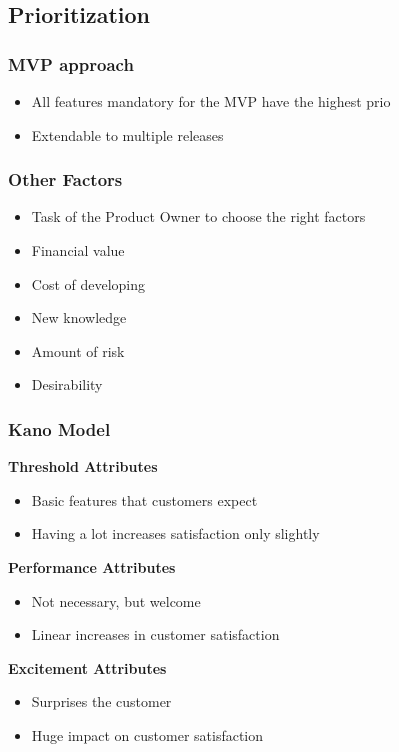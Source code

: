 \subsection{Prioritization}
\subsubsection{MVP approach}
\begin{itemize}
    \item All features mandatory for the MVP have the highest prio
    \item Extendable to multiple releases
\end{itemize}
\subsubsection{Other Factors}
\begin{itemize}
    \item Task of the Product Owner to choose the right factors
    \item Financial value
    \item Cost of developing
    \item New knowledge
    \item Amount of risk
    \item Desirability
\end{itemize}

\subsubsection{Kano Model}
\textbf{Threshold Attributes}
\begin{itemize}
    \item Basic features that customers expect
    \item Having a lot increases satisfaction only slightly
\end{itemize}
\textbf{Performance Attributes}
\begin{itemize}
    \item Not necessary, but welcome
    \item Linear increases in customer satisfaction
\end{itemize}
\textbf{Excitement Attributes}
\begin{itemize}
    \item Surprises the customer
    \item Huge impact on customer satisfaction
\end{itemize}

